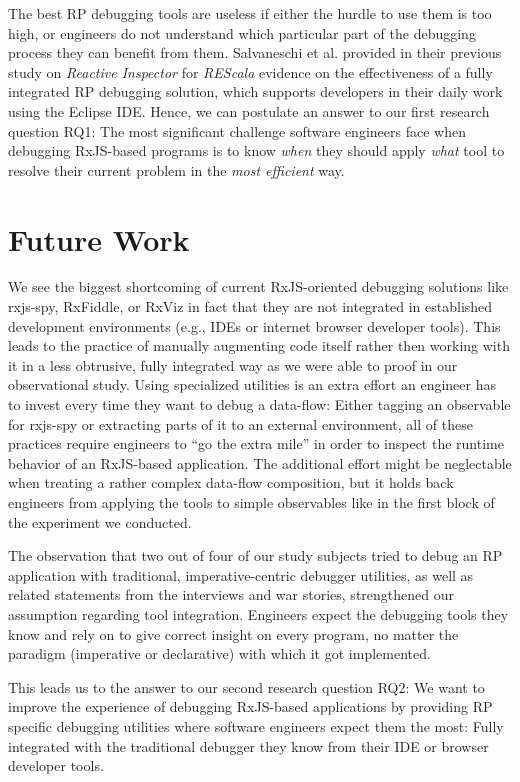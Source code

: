 \documentclass[sigplan,screen,review]{acmart}
\begin{document}
The best RP debugging tools are useless if either the hurdle to use them is too high, or engineers do not understand which particular part of the debugging process they can benefit from them. Salvaneschi et al. \cite{10.1145/2884781.2884815} provided in their previous study on \emph{Reactive Inspector} for \emph{REScala} evidence on the effectiveness of a fully integrated RP debugging solution, which supports developers in their daily work using the Eclipse IDE. Hence, we can postulate an answer to our first research question RQ1: The most significant challenge software engineers face when debugging RxJS-based programs is to know \emph{when} they should apply \emph{what} tool to resolve their current problem in the \emph{most efficient} way.

\section{Future Work}
\label{sec:future}

We see the biggest shortcoming of current RxJS-oriented debugging solutions like rxjs-spy, RxFiddle, or RxViz in fact that they are not integrated in established development environments (e.g., IDEs or internet browser developer tools). This leads to the practice of manually augmenting code itself rather then working with it in a less obtrusive, fully integrated way as we were able to proof in our observational study. Using specialized utilities is an extra effort an engineer has to invest every time they want to debug a data-flow: Either tagging an observable for rxjs-spy or extracting parts of it to an external environment, all of these practices require engineers to ``go the extra mile'' in order to inspect the runtime behavior of an RxJS-based application. The additional effort might be neglectable when treating a rather complex data-flow composition, but it holds back engineers from applying the tools to simple observables like in the first block of the experiment we conducted.

The observation that two out of four of our study subjects tried to debug an RP application with traditional, imperative-centric debugger utilities, as well as related statements from the interviews and war stories, strengthened our assumption regarding tool integration. Engineers expect the debugging tools they know and rely on to give correct insight on every program, no matter the paradigm (imperative or declarative) with which it got implemented.

This leads us to the answer to our second research question RQ2: We want to improve the experience of debugging RxJS-based applications by providing RP specific debugging utilities where software engineers expect them the most: Fully integrated with the traditional debugger they know from their IDE or browser developer tools.
\end{document}
